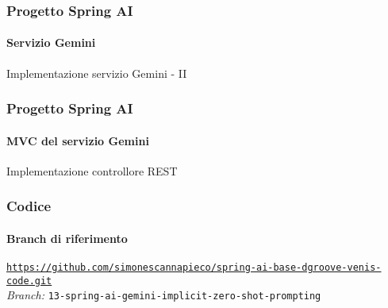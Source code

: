 %
\begin{frame}[t,fragile] \frametitle{Progetto Spring AI}
    \framesubtitle{Servizio Gemini}
        \begin{block}{Implementazione servizio Gemini - II}
            {\tiny}
    \end{block}
\end{frame}
%
\begin{frame}[t,fragile] \frametitle{Progetto Spring AI}
    \framesubtitle{MVC del servizio Gemini}
    	\vspace*{-.7cm}
        \begin{block}{Implementazione controllore REST}
			{\tiny}
    	\end{block}
\end{frame}
%
\begin{frame}[fragile] \frametitle{Codice}
    \framesubtitle{Branch di riferimento}
	\begin{center}
		{\scriptsize \href{https://github.com/simonescannapieco/spring-ai-base-dgroove-venis-code.git}{\texttt{https://github.com/simonescannapieco/spring-ai-base-dgroove-venis-code.git}}}\\
		\textit{Branch:} \alert{\texttt{13-spring-ai-gemini-implicit-zero-shot-prompting}}
	\end{center}
\end{frame}